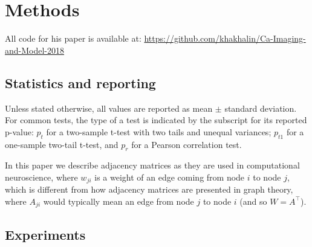 \documentclass{article}
\begin{document}
\section*{Methods}

All code for his paper is available at: \url{https://github.com/khakhalin/Ca-Imaging-and-Model-2018}

\subsection*{Statistics and reporting}

Unless stated otherwise, all values are reported as mean $\pm$ standard deviation. For common tests, the type of a test is indicated by the subscript for its reported p-value: $p_t$ for a two-sample t-test with two tails and unequal variances; $p_{t1}$ for a one-sample two-tail t-test, and $p_r$ for a Pearson correlation test.

In this paper we describe adjacency matrices as they are used in computational neuroscience, where $w_{ji}$ is a weight of an edge coming from node $i$ to node $j$, which is different from how adjacency matrices are presented in graph theory, where $A_{ji}$ would typically mean an edge from node $j$ to node $i$ (and so $W = A^\top$).

\subsection*{Experiments}
\end{document}

